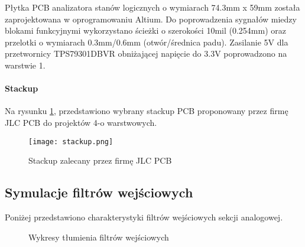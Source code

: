     Płytka PCB analizatora stanów logicznych o wymiarach 74.3mm x 59mm została zaprojektowana w oprogramowaniu Altium.
    Do poprowadzenia sygnałów miedzy blokami funkcyjnymi wykorzystano ścieżki o szerokości 10mil (0.254mm) oraz przelotki o wymiarach 0.3mm/0.6mm (otwór/średnica padu).
    Zasilanie 5V dla przetwornicy TPS79301DBVR obniżającej napięcie do 3.3V poprowadzono na warstwie 1. 

\paragraph{Stackup}
    Na rysunku \ref{fig:stackup}, przedstawiono wybrany stackup PCB proponowany przez firmę JLC PCB do projektów 4-o warstwowych.
    \begin{figure}[!ht]
        \centering
        \texttt{[image: stackup.png]}
        \caption{Stackup zalecany przez firmę JLC PCB}
        \label{fig:stackup}
    \end{figure}


\subsection{Symulacje filtrów wejściowych}
Poniżej przedstawiono charakterystyki filtrów wejściowych sekcji analogowej.
\begin{figure}[!ht]
    \centering
    \caption{Wykresy tłumienia filtrów wejściowych}
\end{figure}